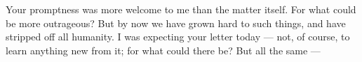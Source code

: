

 Your promptness was more welcome to me than the matter itself. For what could be more outrageous? But by now we have grown hard to such things, and have stripped off all humanity. I was expecting your letter today --- not, of course, to learn anything new from it; for what could there be? But all the same ---
